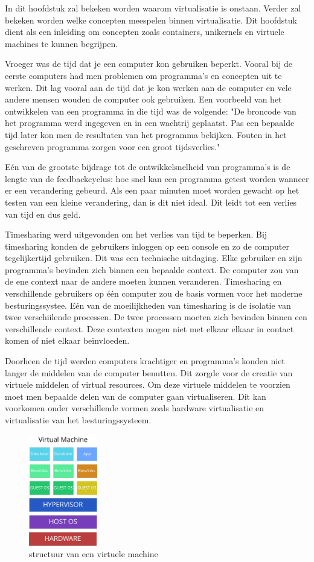 \documentclass[pdftex,a4paper,12pt,twoside]{report}
\begin{document}
In dit hoofdstuk zal bekeken worden waarom virtualisatie is onstaan. Verder zal bekeken worden welke concepten meespelen binnen virtualisatie. Dit hoofdstuk dient als een inleiding om concepten zoals containers, unikernels en virtuele machines te kunnen begrijpen.

Vroeger was de tijd dat je een computer kon gebruiken beperkt. Vooral bij de eerste computers had men problemen om programma's en concepten uit te werken. Dit lag vooral aan de tijd dat je kon werken aan de computer en vele andere mensen wouden de computer ook gebruiken. Een voorbeeld van het ontwikkelen van een programma in die tijd was de volgende: "De broncode van het programma werd ingegeven en in een wachtrij geplaatst. Pas een bepaalde tijd later kon men de resultaten van het programma bekijken. Fouten in het geschreven programma zorgen voor een groot tijdsverlies."

Eén van de grootste bijdrage tot de ontwikkelsnelheid van programma's is de lengte van de feedbackcyclus: hoe snel kan een programma getest worden wanneer er een verandering gebeurd. Als een paar minuten moet worden gewacht op het testen van een kleine verandering, dan is dit niet ideal. Dit leidt tot een verlies van tijd en dus geld.

Timesharing werd uitgevonden om het verlies van tijd te beperken. Bij timesharing konden de gebruikers inloggen op een console en zo de computer tegelijkertijd gebruiken. Dit was een technische uitdaging. Elke gebruiker en zijn programma's bevinden zich binnen een bepaalde context. De computer zou van de ene context naar de andere moeten kunnen veranderen. Timesharing en verschillende gebruikers op één computer zou de basis vormen voor het moderne besturingssystee. Eén van de moeilijkheden van timesharing is de isolatie van twee verschiilende processen. De twee processen moeten zich bevinden binnen een verschillende context. Deze contexten mogen niet met elkaar elkaar in contact komen of niet elkaar beïnvloeden.

Doorheen de tijd werden computers krachtiger en programma's konden niet langer de middelen van de computer benutten. Dit zorgde voor de creatie van virtuele middelen of virtual resources. Om deze virtuele middelen te voorzien moet men bepaalde delen van de computer gaan virtualiseren. Dit kan voorkomen onder verschillende vormen zoals hardware virtualisatie en virtualisatie van het besturingssysteem. 

\begin{figure}
    \centering
    \includegraphics[width=3cm]{img/virtual-machine}
    \caption{structuur van een virtuele machine}
    \label{fig:virtualmachine}
\end{figure}
\end{document}
